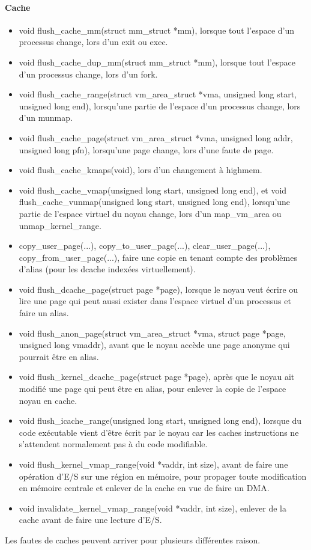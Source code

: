 \documentclass[oneside]{book}
\begin{document}
\paragraph{Cache}
\begin{itemize}
\item void flush\_cache\_mm(struct mm\_struct *mm), lorsque tout l'espace d'un processus
change, lors d'un exit ou exec.
\item void flush\_cache\_dup\_mm(struct mm\_struct *mm), lorsque tout l'espace d'un
processus change, lors d'un fork.
\item void flush\_cache\_range(struct vm\_area\_struct *vma, unsigned long start, unsigned
long end), lorsqu'une partie de l'espace d'un processus change, lors d'un munmap.
\item void flush\_cache\_page(struct vm\_area\_struct *vma, unsigned long addr, unsigned
long pfn), lorsqu'une page change, lors d'une faute de page.
\item void flush\_cache\_kmaps(void), lors d'un changement à highmem.
\item void flush\_cache\_vmap(unsigned long start, unsigned long end), et void
flush\_cache\_vunmap(unsigned long start, unsigned long end), lorsqu'une partie de
l'espace virtuel du noyau change, lors d'un map\_vm\_area ou unmap\_kernel\_range.
\item copy\_user\_page(...), copy\_to\_user\_page(...), clear\_user\_page(...), copy\_from\_user\_page(...), faire une
copie en tenant compte des problèmes d'alias (pour les dcache indexées virtuellement).
\item void flush\_dcache\_page(struct page *page), lorsque le noyau veut écrire ou lire une page qui peut aussi
exister dans l'espace virtuel d'un processus et faire un alias.
\item void flush\_anon\_page(struct vm\_area\_struct *vma, struct page *page, unsigned long vmaddr), avant que le
noyau accède une page anonyme qui pourrait être en alias.
\item void flush\_kernel\_dcache\_page(struct page *page), après que le noyau ait modifié une page qui peut être
en alias, pour enlever la copie de l'espace noyau en cache.
\item void flush\_icache\_range(unsigned long start, unsigned long end), lorsque du code exécutable vient d'être
écrit par le noyau car les caches instructions ne s'attendent normalement pas à du code modifiable.
\item void flush\_kernel\_vmap\_range(void *vaddr, int size), avant de faire une opération d'E/S sur une région en
mémoire, pour propager toute modification en mémoire centrale et enlever de la cache en vue de faire un
DMA.
\item void invalidate\_kernel\_vmap\_range(void *vaddr, int size), enlever de la cache avant de faire une lecture
d'E/S.
\end{itemize}
Les fautes de caches peuvent arriver pour plusieurs différentes raison.
\end{document}
